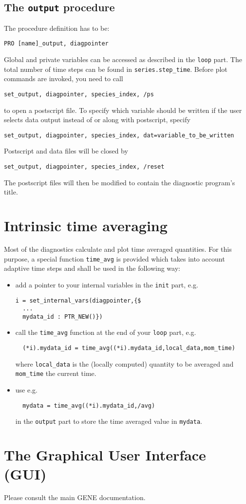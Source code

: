 \documentclass[12pt]{article}
\begin{document}
\subsection{The \texttt{output} procedure}

The procedure definition has to be:
\begin{verbatim}
PRO [name]_output, diagpointer
\end{verbatim}
Global and private variables can be accessed as described in the
{\tt loop} part. The  total number of time steps can be found in
{\tt series.step\_time}. Before plot commands are invoked, you
need to call
\begin{verbatim}
set_output, diagpointer, species_index, /ps
\end{verbatim}
to open a postscript file. To specify which variable should be
written if the user selects data output instead of or along with
postscript, specify
\begin{verbatim}
set_output, diagpointer, species_index, dat=variable_to_be_written
\end{verbatim}
Postscript and data files will be closed by
\begin{verbatim}
set_output, diagpointer, species_index, /reset
\end{verbatim}
The postscript files will then be modified to contain the
diagnostic program's title.

\section{Intrinsic time averaging}
Most of the diagnostics calculate and plot time averaged quantities.
For this purpose, a special function \texttt{time\_avg} is provided 
which takes into account adaptive time steps and 
shall be used in the following way:
\begin{itemize}
\item add a pointer to your internal variables in the \texttt{init} part,
e.g. 
\begin{verbatim}
i = set_internal_vars(diagpointer,{$
  ...
  mydata_id : PTR_NEW()})
\end{verbatim}
%
\item call the \texttt{time\_avg} function at the end of your 
\texttt{loop} part, e.g.
\begin{verbatim}
  (*i).mydata_id = time_avg((*i).mydata_id,local_data,mom_time)
\end{verbatim}
where \texttt{local\_data} is the (locally computed) quantity 
to be averaged and \texttt{mom\_time} the current time.
\item use e.g.
\begin{verbatim}
  mydata = time_avg((*i).mydata_id,/avg)
\end{verbatim}
in the \texttt{output} part to store the time averaged value
in \texttt{mydata}.
\end{itemize}

\section{The Graphical User Interface (GUI)}
Please consult the main {\sc GENE} documentation.
\end{document}
